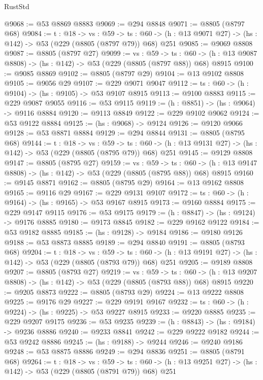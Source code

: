\begin{lexlean}{RustStd}
\begin{coremodule}
@9068 := @53 @8869 @8883
@9069 := @294 @8848
@9071 := @8805 (@8797 @68)
@9084 := {t : @18} ->
  {vs : @59} ->
  {ts : @60} -> (h : @13 @9071 @27) -> (hs : @142) -> @53 (@229 (@8805 (@8797 @79)) @68) @251
@9085 := @9069 @8808
@9087 := @8805 (@8797 @27)
@9099 := {vs : @59} ->
  {ts : @60} -> (h : @13 @9087 @8808) -> (hs : @142) -> @53 (@229 (@8805 (@8797 @88)) @68) @8915
@9100 := @9085 @8869
@9102 := @8805 (@8797 @29)
@9104 := @13 @9102 @8808
@9105 := @9056 @29
@9107 := @229 @9071 @9047
@9112 := {ts : @60} -> (h : @9104) -> (hs : @9105) -> @53 @9107 @8915
@9113 := @9100 @8883
@9115 := @229 @9087 @9055
@9116 := @53 @9115
@9119 := (h : @8851) -> (hs : @9064) -> @9116 @8884
@9120 := @9113 @8849
@9122 := @229 @9102 @9062
@9124 := @53 @9122 @8884
@9125 := (hs : @9068) -> @9124
@9126 := @9120 @9066
@9128 := @53 @8871 @8884
@9129 := @294 @8844
@9131 := @8805 (@8795 @68)
@9144 := {t : @18} ->
  {vs : @59} ->
  {ts : @60} -> (h : @13 @9131 @27) -> (hs : @142) -> @53 (@229 (@8805 (@8795 @79)) @68) @251
@9145 := @9129 @8808
@9147 := @8805 (@8795 @27)
@9159 := {vs : @59} ->
  {ts : @60} -> (h : @13 @9147 @8808) -> (hs : @142) -> @53 (@229 (@8805 (@8795 @88)) @68) @8915
@9160 := @9145 @8871
@9162 := @8805 (@8795 @29)
@9164 := @13 @9162 @8808
@9165 := @9116 @29
@9167 := @229 @9131 @9107
@9172 := {ts : @60} -> (h : @9164) -> (hs : @9165) -> @53 @9167 @8915
@9173 := @9160 @8884
@9175 := @229 @9147 @9115
@9176 := @53 @9175
@9179 := (h : @8847) -> (hs : @9124) -> @9176 @8885
@9180 := @9173 @8845
@9182 := @229 @9162 @9122
@9184 := @53 @9182 @8885
@9185 := (hs : @9128) -> @9184
@9186 := @9180 @9126
@9188 := @53 @8873 @8885
@9189 := @294 @8840
@9191 := @8805 (@8793 @68)
@9204 := {t : @18} ->
  {vs : @59} ->
  {ts : @60} -> (h : @13 @9191 @27) -> (hs : @142) -> @53 (@229 (@8805 (@8793 @79)) @68) @251
@9205 := @9189 @8808
@9207 := @8805 (@8793 @27)
@9219 := {vs : @59} ->
  {ts : @60} -> (h : @13 @9207 @8808) -> (hs : @142) -> @53 (@229 (@8805 (@8793 @88)) @68) @8915
@9220 := @9205 @8873
@9222 := @8805 (@8793 @29)
@9224 := @13 @9222 @8808
@9225 := @9176 @29
@9227 := @229 @9191 @9167
@9232 := {ts : @60} -> (h : @9224) -> (hs : @9225) -> @53 @9227 @8915
@9233 := @9220 @8885
@9235 := @229 @9207 @9175
@9236 := @53 @9235
@9239 := (h : @8843) -> (hs : @9184) -> @9236 @8886
@9240 := @9233 @8841
@9242 := @229 @9222 @9182
@9244 := @53 @9242 @8886
@9245 := (hs : @9188) -> @9244
@9246 := @9240 @9186
@9248 := @53 @8875 @8886
@9249 := @294 @8836
@9251 := @8805 (@8791 @68)
@9264 := {t : @18} ->
  {vs : @59} ->
  {ts : @60} -> (h : @13 @9251 @27) -> (hs : @142) -> @53 (@229 (@8805 (@8791 @79)) @68) @251

\end{coremodule}
\end{lexlean}
